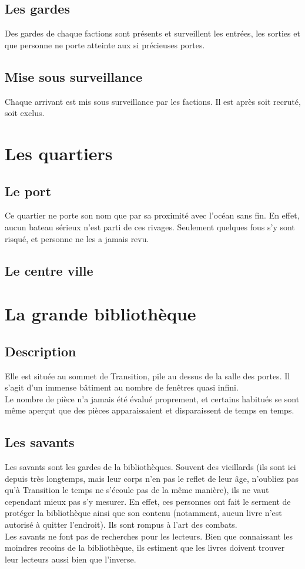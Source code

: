 \documentclass{book}
\begin{document}
\subsection{Les gardes}
Des gardes de chaque factions sont présents et surveillent les entrées, les sorties et que personne ne porte atteinte aux si précieuses portes.

\subsection{Mise sous surveillance}
Chaque arrivant est mis sous surveillance par les factions. Il est après soit recruté, soit exclus.

\section{Les quartiers}
\subsection{Le port}
Ce quartier ne porte son nom que par sa proximité avec l'océan sans fin. %
En effet, aucun bateau sérieux n'est parti de ces rivages. Seulement quelques fous s'y sont risqué, et personne ne les a jamais revu.

\subsection{Le centre ville}

\section{La grande bibliothèque}
\subsection{Description}
Elle est située au sommet de Transition, pile au dessus de la salle des portes. Il s'agit d'un immense bâtiment au nombre de fenêtres quasi infini.\\
Le nombre de pièce n'a jamais été évalué proprement, et certains habitués se sont même aperçut que des pièces apparaissaient et disparaissent de temps en temps.
\subsection{Les savants}
Les savants sont les gardes de la bibliothèques. Souvent des vieillards (ils sont ici depuis très longtemps, mais leur corps n'en pas le reflet de leur âge, n'oubliez pas qu'à Transition le temps ne s'écoule pas de la même manière), ils ne vaut cependant mieux pas s'y mesurer. En effet, ces personnes ont fait le serment de protéger la bibliothèque ainsi que son contenu (notamment, aucun livre n'est autorisé à quitter l'endroit). Ils sont rompus à l'art des combats.
\\
Les savants ne font pas de recherches pour les lecteurs. Bien que connaissant les moindres recoins de la bibliothèque, ils estiment que les livres doivent trouver leur lecteurs aussi bien que l'inverse.
\end{document}
